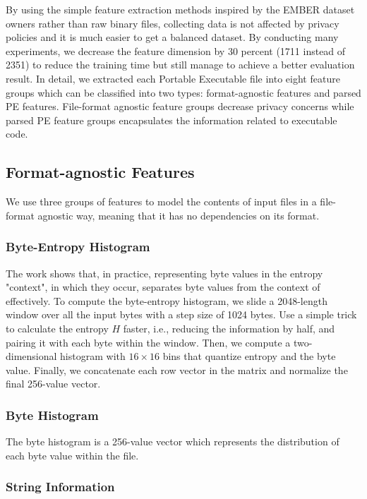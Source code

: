 By using the simple feature extraction methods inspired by the EMBER dataset owners rather than raw binary files, collecting data is not affected by privacy policies and it is much easier to get a balanced dataset.
By conducting many experiments, we decrease the feature dimension by 30 percent (1711 instead of 2351) to reduce the training time but still manage to achieve a better evaluation result.
In detail, we extracted each Portable Executable file into eight feature groups which can be classified into two types: format-agnostic features and parsed PE features.
File-format agnostic feature groups decrease privacy concerns while parsed PE feature groups encapsulates the information related to executable code.

\subsection{Format-agnostic Features}

We use three groups of features to model the contents of input files in a file-format agnostic way, meaning that it has no dependencies on its format.

\subsubsection{Byte-Entropy Histogram}

The work \cite{saxe2015deep} shows that, in practice, representing byte values in the entropy "context", in which they occur, separates byte values from the context of effectively. 
To compute the byte-entropy histogram, we slide a 2048-length window over all the input bytes with a step size of 1024 bytes. 
Use a simple trick to calculate the entropy $H$ faster, i.e., reducing the information by half, and pairing it with each byte within the window. 
Then, we compute a two-dimensional histogram with $16 \times 16$ bins that quantize entropy and the byte value. 
Finally, we concatenate each row vector in the matrix and normalize the final 256-value vector.

\subsubsection{Byte Histogram}

The byte histogram is a 256-value vector which represents the distribution of each byte value within the file.

\subsubsection{String Information}

